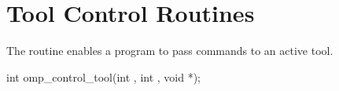 %
%
%
%
%
%
%
%
%
%
%
%
%


\section{Tool Control Routines}
\label{sec:control_tool}

\summary
The  routine enables a program to
pass commands to an active tool.

\format


\begin{ccppspecific}
\begin{ompcFunction}
int omp_control_tool(int , int , void *);
\end{ompcFunction}
\end{ccppspecific}


